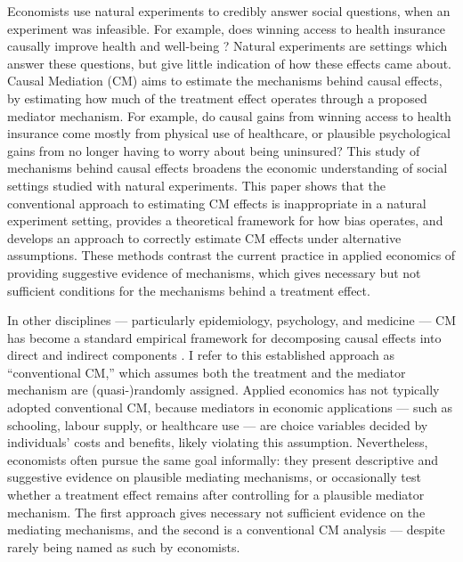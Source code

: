 Economists use natural experiments to credibly answer social questions, when an experiment was infeasible.
For example, does winning access to health insurance causally improve health and well-being \citep{finkelstein2008oregon}?
Natural experiments are settings which answer these questions, but give little indication of how these effects came about.
Causal Mediation (CM) aims to estimate the mechanisms behind causal effects, by estimating how much of the treatment effect operates through a proposed mediator mechanism.
For example, do causal gains from winning access to health insurance come mostly from physical use of healthcare, or plausible psychological gains from no longer having to worry about being uninsured?
This study of mechanisms behind causal effects broadens the economic understanding of social settings studied with natural experiments.
This paper shows that the conventional approach to estimating CM effects is inappropriate in a natural experiment setting, provides a theoretical framework for how bias operates, and develops an approach to correctly estimate CM effects under alternative assumptions.
These methods contrast the current practice in applied economics of providing suggestive evidence of mechanisms, which gives necessary but not sufficient conditions for the mechanisms behind a treatment effect.

In other disciplines --- particularly epidemiology, psychology, and medicine --- CM has become a standard empirical framework for decomposing causal effects into direct and indirect components \citep{imai2010identification}.
I refer to this established approach as ``conventional CM,'' which assumes both the treatment and the mediator mechanism are (quasi-)randomly assigned.
Applied economics has not typically adopted conventional CM, because mediators in economic applications --- such as schooling, labour supply, or healthcare use --- are choice variables decided by individuals' costs and benefits, likely violating this assumption.
Nevertheless, economists often pursue the same goal informally: 
they present descriptive and suggestive evidence on plausible mediating mechanisms, or occasionally test whether a treatment effect remains after controlling for a plausible mediator mechanism.
The first approach gives necessary not sufficient evidence on the mediating mechanisms, and the second is a conventional CM analysis --- despite rarely being named as such by economists.

